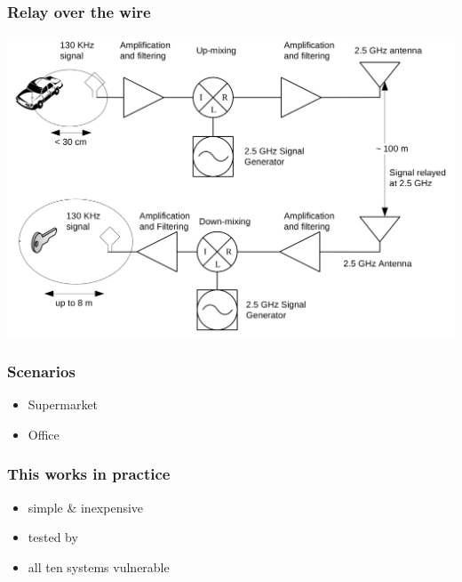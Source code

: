 \documentclass[12pt]{beamer}
\begin{document}
	\begin{frame}
		\frametitle{Relay over the wire}
		\begin{center}
			\includegraphics[scale=0.75]{img/franc_relay_over_the_air.png} 	
		\end{center}
	\end{frame}

	\begin{frame}
		\frametitle{Scenarios}
		\begin{itemize}
			\item Supermarket
			\item Office
		\end{itemize}
	\end{frame}

	\begin{frame}
		\frametitle{This works in practice}
		\begin{itemize}
			\item simple \& inexpensive
			\item tested by \citet*{relayAttacksFranc}
			\item all ten systems vulnerable
		\end{itemize}
	\end{frame}
\end{document}

